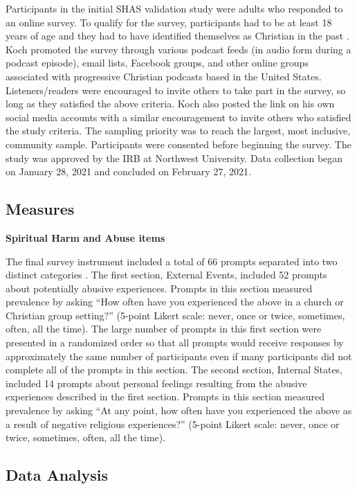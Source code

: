 \documentclass[
]{article}
\begin{document}
Participants in the initial SHAS validation study were adults who responded to an online survey. To qualify for the survey, participants had to be at least 18 years of age and they had to have identified themselves as Christian in the past \citep{KochEdstrom2022}. Koch promoted the survey through various podcast feeds (in audio form during a podcast episode), email lists, Facebook groups, and other online groups associated with progressive Christian podcasts based in the United States. Listeners/readers were encouraged to invite others to take part in the survey, so long as they satisfied the above criteria. Koch also posted the link on his own social media accounts with a similar encouragement to invite others who satisfied the study criteria. The sampling priority was to reach the largest, most inclusive, community sample. Participants were consented before beginning the survey. The study was approved by the IRB at Northwest University. Data collection began on January 28, 2021 and concluded on February 27, 2021.

\hypertarget{measures}{%
\subsection{Measures}\label{measures}}

\textbf{Spiritual Harm and Abuse items}

The final survey instrument included a total of 66 prompts separated into two distinct categories \citep{KochEdstrom2022}. The first section, External Events, included 52 prompts about potentially abusive experiences. Prompts in this section measured prevalence by asking ``How often have you experienced the above in a church or Christian group setting?'' (5-point Likert scale: never, once or twice, sometimes, often, all the time). The large number of prompts in this first section were presented in a randomized order so that all prompts would receive responses by approximately the same number of participants even if many participants did not complete all of the prompts in this section. The second section, Internal States, included 14 prompts about personal feelings resulting from the abusive experiences described in the first section. Prompts in this section measured prevalence by asking ``At any point, how often have you experienced the above as a result of negative religious experiences?'' (5-point Likert scale: never, once or twice, sometimes, often, all the time).

\hypertarget{data-analysis}{%
\subsection{Data Analysis}\label{data-analysis}}
\end{document}

